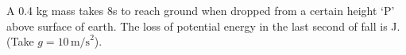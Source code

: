 \item A 0.4 kg mass takes 8s to reach ground when dropped from a certain height ‘P’ above surface of earth. The loss of potential energy in the last second of fall is \underline{\hspace{2.5cm}} J. (Take \( g = 10 \, \text{m/s}^2 \)).
